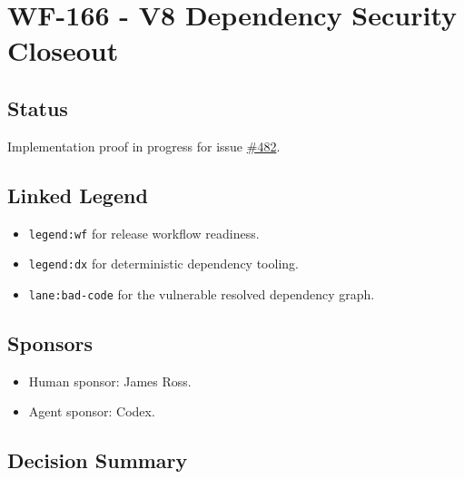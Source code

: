 \chapter{WF-166 - V8 Dependency Security Closeout}\label{record-248}

\smallskip

\section{Status}\label{record-248-status}

Implementation proof in progress for issue \href{https://github.com/flyingrobots/bijou/issues/482}{\#482}.

\section{Linked Legend}\label{record-248-linked-legend}

\begin{itemize}
\tightlist
\item
  \texttt{l\allowbreak{}e\allowbreak{}g\allowbreak{}e\allowbreak{}n\allowbreak{}d\allowbreak{}:\allowbreak{}w\allowbreak{}f} for release workflow readiness.
\item
  \texttt{l\allowbreak{}e\allowbreak{}g\allowbreak{}e\allowbreak{}n\allowbreak{}d\allowbreak{}:\allowbreak{}d\allowbreak{}x} for deterministic dependency tooling.
\item
  \texttt{l\allowbreak{}a\allowbreak{}n\allowbreak{}e\allowbreak{}:\allowbreak{}b\allowbreak{}a\allowbreak{}d\allowbreak{}-\allowbreak{}c\allowbreak{}o\allowbreak{}d\allowbreak{}e} for the vulnerable resolved dependency graph.
\end{itemize}

\section{Sponsors}\label{record-248-sponsors}

\begin{itemize}
\tightlist
\item
  Human sponsor: James Ross.
\item
  Agent sponsor: Codex.
\end{itemize}

\section{Decision Summary}\label{record-248-decision-summary}

